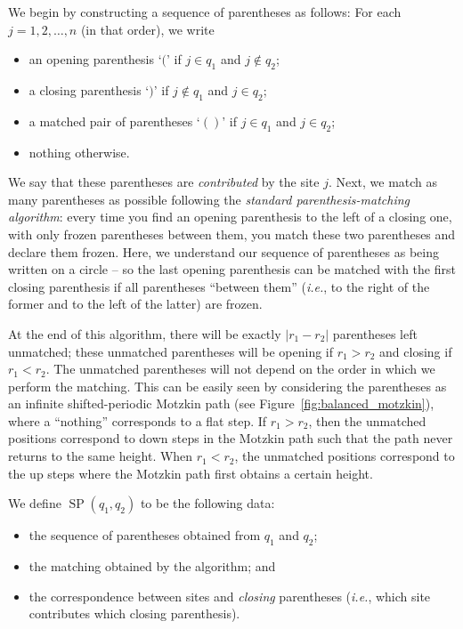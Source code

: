 \documentclass[reqno]{amsart}
\newcommand{\0}{\phantom{c}}
\DeclareMathOperator{\SP}{SP} %
\newcommand{\abs}[1]{\left| #1 \right|}
\newcommand{\defn}[1]{{\color{darkred}\emph{#1}}} %
\theoremstyle{plain}
\theoremstyle{definition}
\numberwithin{equation}{section}
\begin{document}
We begin by constructing a sequence of parentheses as follows: For each $j = 1, 2, \dotsc, n$ (in that order), we write
\begin{itemize}
\item an opening parenthesis `$($' if $j \in q_1$ and $j \notin q_2$;
\item a closing parenthesis `$)$' if $j \notin q_1$ and $j \in q_2$;
\item a matched pair of parentheses `$()$' if $j \in q_1$ and $j \in q_2$;
\item nothing otherwise.
\end{itemize}
We say that these parentheses are \defn{contributed} by the site $j$.
Next, we match as many parentheses as possible following the \defn{standard parenthesis-matching algorithm}:
every time you find an opening parenthesis to the left of a closing one, with only frozen parentheses between them, you match these two parentheses and declare them frozen.
Here, we understand our sequence of parentheses as being written on a circle -- so the last opening parenthesis can be matched with the first closing parenthesis if all parentheses ``between them'' (\textit{i.e.}, to the right of the former and to the left of the latter) are frozen.

At the end of this algorithm, there will be exactly $\abs{r_1 - r_2}$ parentheses left unmatched; these unmatched parentheses will be opening if $r_1 > r_2$ and closing if $r_1 < r_2$. The unmatched parentheses will not depend on the order in which we perform the matching.
This can be easily seen by considering the parentheses as an infinite shifted-periodic Motzkin path (see Figure~\ref{fig:balanced_motzkin}), where a ``nothing'' corresponds to a flat step.
If $r_1 > r_2$, then the unmatched positions correspond to down steps in the Motzkin path such that the path never returns to the same height.
When $r_1 < r_2$, the unmatched positions correspond to the up steps where the Motzkin path first obtains a certain height.

We define \defn{$\SP(q_1, q_2)$} to be the following data:
\begin{itemize}
\item the sequence of parentheses obtained from $q_1$ and $q_2$;
\item the matching obtained by the algorithm; and
\item the correspondence between sites and \emph{closing} parentheses (\textit{i.e.}, which site contributes which closing parenthesis).
\end{itemize}
\end{document}
